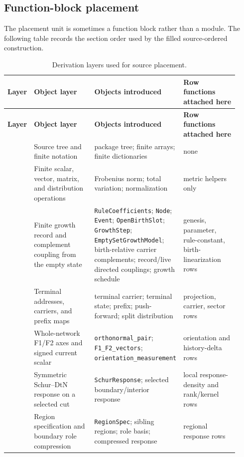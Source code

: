 \documentclass[11pt]{article}
\theoremstyle{remark}
\newcommand{\code}[1]{\texttt{#1}}
\numberwithin{equation}{section}
\begin{document}
\subsection{Function-block placement}
The placement unit is sometimes a function block rather than a module. The following table records the section order used by the filled source-ordered construction.
\begin{longtable}{>{\raggedright\arraybackslash}p{0.07\linewidth}>{\raggedright\arraybackslash}p{0.29\linewidth}>{\raggedright\arraybackslash}p{0.31\linewidth}>{\raggedright\arraybackslash}p{0.25\linewidth}}
\caption{Derivation layers used for source placement.}\label{tab:derivation-layers}\\
\toprule
\textbf{Layer} & \textbf{Object layer} & \textbf{Objects introduced} & \textbf{Row functions attached here}\\
\midrule
\endfirsthead
\toprule
\textbf{Layer} & \textbf{Object layer} & \textbf{Objects introduced} & \textbf{Row functions attached here}\\
\midrule
\endhead
0 & Source tree and finite notation & package tree; finite arrays; finite dictionaries & none\\
\hline
1 & Finite scalar, vector, matrix, and distribution operations & Frobenius norm; total variation; normalization & metric helpers only\\
\hline
2 & Finite growth record and complement coupling from the empty state & \code{RuleCoefficients}; \code{Node}; \code{Event}; \code{OpenBirthSlot}; \code{GrowthStep}; \code{EmptySetGrowthModel}; birth-relative carrier complements; record/live directed couplings; growth schedule & genesis, parameter, rule-constant, birth-linearization rows\\
\hline
3 & Terminal addresses, carriers, and prefix maps & terminal carrier; terminal state; prefix; push-forward; split distribution & projection, carrier, sector rows\\
\hline
4 & Whole-network F1/F2 axes and signed current scalar & \code{orthonormal\_pair}; \code{F1\_F2\_vectors}; \code{orientation\_measurement} & orientation and history-delta rows\\
\hline
5 & Symmetric Schur--DtN response on a selected cut & \code{SchurResponse}; selected boundary/interior response & local response-density and rank/kernel rows\\
\hline
6 & Region specification and boundary role compression & \code{RegionSpec}; sibling regions; role basis; compressed response & regional response rows\\

\end{longtable}
\end{document}
